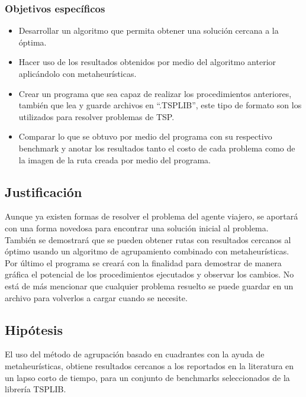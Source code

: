 \subsubsection{Objetivos específicos}
  \begin{itemize} 
    \item Desarrollar un algoritmo que permita obtener una solución cercana a la óptima.
    \item Hacer uso de los resultados obtenidos por medio del algoritmo anterior aplicándolo con metaheurísticas.  
    \item Crear un programa que sea capaz de realizar los procedimientos anteriores, también que lea y guarde archivos en “.TSPLIB”, este tipo de formato son los utilizados para resolver problemas de TSP.
    \item Comparar lo que se obtuvo por medio del programa con su respectivo benchmark y anotar los resultados tanto el costo de cada problema como de la imagen de la ruta creada por medio del programa.
  \end{itemize}
  
\subsection{Justificación}
Aunque ya existen formas de resolver el problema del agente viajero, se aportará con una forma novedosa para encontrar una solución inicial al problema.\\
\hspace*{1cm}También se demostrará que se pueden obtener rutas con resultados cercanos al óptimo usando un algoritmo de agrupamiento combinado con metaheurísticas.\\
\hspace*{1cm}Por último el programa se creará con la finalidad para demostrar de manera gráfica el potencial de los procedimientos ejecutados y observar los cambios. No está de más mencionar que cualquier problema resuelto se puede guardar en un archivo para volverlos a cargar cuando se necesite.

\subsection{Hipótesis}
El uso del método de agrupación basado en cuadrantes con la ayuda de metaheurísticas, obtiene resultados cercanos a los reportados en la literatura en un lapso corto de tiempo, para  un conjunto de benchmarks seleccionados de la librería TSPLIB.\\

